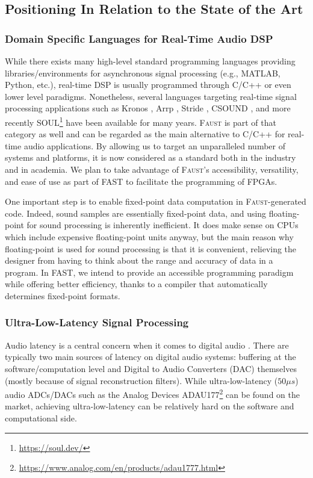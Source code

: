\documentclass[a4paper,9pt]{extarticle}
\newcommand{\F}{\textsc{Faust}}
\newcommand{\PP}{FAST}
\begin{document}
\subsection{Positioning In Relation to the State of the Art}

\subsubsection{Domain Specific Languages for Real-Time Audio DSP}

While there exists many high-level standard programming languages providing libraries/environments for asynchronous signal processing (e.g., MATLAB, Python, etc.), real-time DSP is usually programmed through C/C++ or even lower level paradigms. Nonetheless, several languages targeting real-time signal processing applications such as Kronos \cite{norilo2015kronos}, Arrp \cite{leben2016arrp}, Stride \cite{tilbian2017stride}, CSOUND \cite{lazzarini2016csound}, and more recently SOUL\footnote{\url{https://soul.dev/}} have been available for many years. \F{} \cite{Orlarey2009} is part of that category as well and can be regarded as the main alternative to C/C++ for real-time audio applications. By allowing us to target an unparalleled number of systems and platforms, it is now considered as a standard both in the industry and in academia. We plan to take advantage of \F{}'s accessibility, versatility, and ease of use as part of \PP{} to facilitate the programming of FPGAs. 

One important step is to enable fixed-point data computation in \F{}-generated code. Indeed, sound samples are essentially fixed-point data, and using floating-point for sound processing is inherently inefficient. It does make sense on CPUs which include expensive floating-point units anyway, but the main reason why floating-point is used for sound processing is that it is convenient, relieving the designer from having to think about the range and accuracy of data in a program.
In \PP{}, we intend to provide an accessible programming paradigm while offering better efficiency, thanks to a compiler that automatically determines fixed-point formats.

\subsubsection{Ultra-Low-Latency Signal Processing}
\label{subsubsec:lowlatency}

Audio latency is a central concern when it comes to digital audio \cite{Lago2004}. There are typically two main sources of latency on digital audio systems: buffering at the software/computation level and Digital to Audio Converters (DAC) themselves (mostly because of signal reconstruction filters). While ultra-low-latency ($50 \mu s$) audio ADCs/DACs such as the Analog Devices ADAU177\footnote{\url{https://www.analog.com/en/products/adau1777.html}} can be found on the market, achieving ultra-low-latency can be relatively hard on the software and computational side. 
\end{document}
